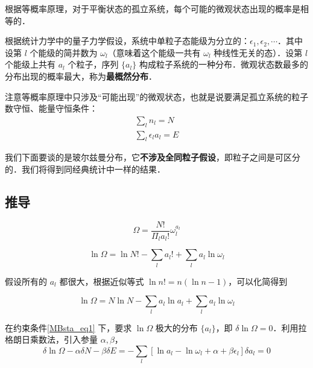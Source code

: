 

根据等概率原理，对于平衡状态的孤立系统，每个可能的微观状态出现的概率是相等的．

根据统计力学中的量子力学假设，系统中单粒子态能级为分立的：$\epsilon_1,\epsilon_2,\cdots$．其中设第 $l$ 个能级的简并数为 $\omega_l$（意味着这个能级一共有 $\omega_l$ 种线性无关的态）．设第 $l$ 个能级上共有 $a_l$ 个粒子，序列 $\{a_l\}$ 构成粒子系统的一种分布．微观状态数最多的分布出现的概率最大，称为\textbf{最概然分布}．

注意等概率原理中只涉及“可能出现”的微观状态，也就是说要满足孤立系统的粒子数守恒、能量守恒条件：
\begin{equation}\label{MBsta_eq1}
\begin{aligned}
\sum_l n_l=N\\
\sum_l \epsilon_l a_l=E
\end{aligned}
\end{equation}

我们下面要谈的是玻尔兹曼分布，它\textbf{不涉及全同粒子假设}，即粒子之间是可区分的．我们将得到同经典统计中一样的结果．

\subsection{推导}
\begin{equation}
\Omega=\frac{N!}{\Pi_l a_l!}\omega_l^{a_l}
\end{equation}

\begin{equation}
\ln \Omega=\ln N!-\sum_{l}a_l!+\sum_l a_l\ln \omega_l
\end{equation}

假设所有的 $a_l$ 都很大，根据近似等式 $\ln n! = n(\ln n-1)$，可以化简得到

\begin{equation}
\ln \Omega=N\ln N-\sum_l a_l\ln a_l+\sum_l a_l\ln \omega_l
\end{equation}

在约束条件\autoref{MBsta_eq1} 下，要求 $\ln \Omega$ 极大的分布 $\{a_l\}$，即 $\delta \ln \Omega =0$．利用拉格朗日乘数法，引入参量 $\alpha,\beta$，
\begin{equation}
\delta \ln \Omega -\alpha \delta N-\beta \delta E=-\sum_l [\ln a_l-\ln \omega_l+\alpha +\beta\epsilon_l]\delta a_l=0
\end{equation}